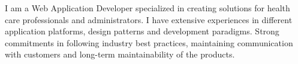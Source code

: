 

\begin{cvparagraph}

I am a Web Application Developer specialized in creating solutions for health care professionals and administrators. I have extensive experiences in different application platforms, design patterns and development paradigms. Strong commitments in following industry best practices, maintaining communication with customers and long-term maintainability of the products.
\end{cvparagraph}
